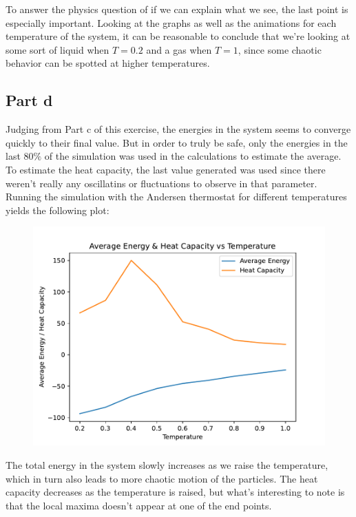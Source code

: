 \documentclass[a4paper,12pt]{article}
\begin{document}
To answer the physics question of if we can explain what we see, the last point is especially important. Looking at
the graphs as well as the animations for each temperature of the system, it can be reasonable to conclude that we're
looking at some sort of liquid when $T = 0.2$ and a gas when $T = 1$, since some chaotic behavior can be spotted at
higher temperatures.

\subsection*{Part d}

Judging from Part c of this exercise, the energies in the system seems to converge quickly to their final value. But
in order to truly be safe, only the energies in the last $80\%$ of the simulation was used in the calculations to
estimate the average. To estimate the heat capacity, the last value generated was used since there weren't really any
oscillatins or fluctuations to observe in that parameter. Running the simulation with the Andersen thermostat for
different temperatures yields the following plot:

\begin{figure}[!ht]
  \centering
  \includegraphics[scale=0.49]{img/3_2d_ECvvsT.pdf}
\end{figure}

\FloatBarrier

The total energy in the system slowly increases as we raise the temperature, which in turn also leads to more chaotic
motion of the particles. The heat capacity decreases as the temperature is raised, but what's interesting to note is
that the local maxima doesn't appear at one of the end points.
\end{document}

